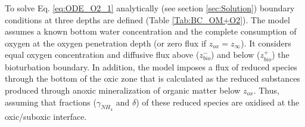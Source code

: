 \documentclass[gmd, manuscript]{copernicus}
\begin{document}
To solve Eq. \ref{eq:ODE_O2_1} analytically (see section \ref{sec:Solution}) boundary conditions at three depths are defined (Table \ref{Tab:BC_OM+O2}). 
The model assumes a known bottom water concentration and the complete consumption of oxygen at the oxygen penetration depth (or zero flux if $z_{ox}=z_\infty$). 
It considers equal oxygen concentration and diffusive flux above ($z_{bio}^-$) and 
below ($z_{bio}^+$) the bioturbation boundary. In addition, the model imposes a flux of reduced species through the bottom of the oxic zone that is calculated as the reduced substances produced through anoxic mineralization 
of organic matter below $z_{ox}$. Thus, assuming that fractions ($\gamma_{NH_4}$ and $\delta$) of these reduced species are oxidised at the oxic/suboxic interface.
\end{document}

